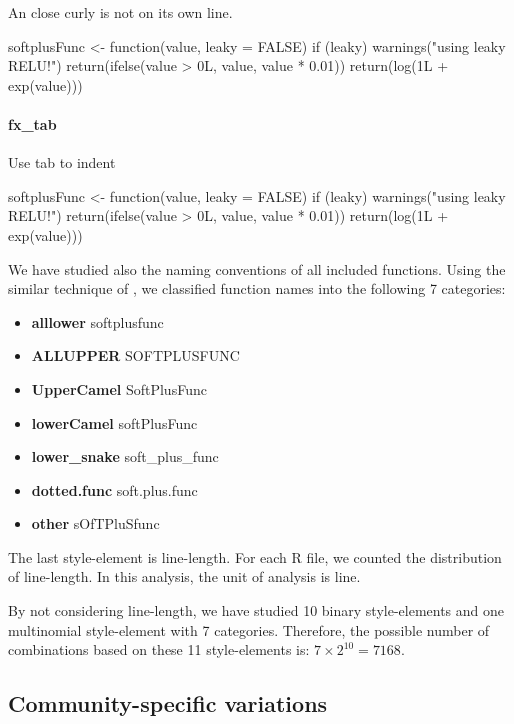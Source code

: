 An close curly is not on its own line.

\begin{example}
softplusFunc <- function(value, leaky = FALSE) {
    if (leaky) {
        warnings("using leaky RELU!")
        return(ifelse(value > 0L, value, value * 0.01)) }
    return(log(1L + exp(value))) }
\end{example}

\paragraph{fx\_tab}

Use tab to indent

\begin{example}
softplusFunc <- function(value, leaky = FALSE) {
    if (leaky) {
        warnings("using leaky RELU!")
        return(ifelse(value > 0L, value, value * 0.01))
    }
    return(log(1L + exp(value)))
}
\end{example}

We have studied also the naming conventions of all included functions. Using the similar technique of \citet{baaaath}, we classified function names into the following 7 categories:

\begin{itemize}
  \item \textbf{alllower} softplusfunc
  \item \textbf{ALLUPPER} SOFTPLUSFUNC
  \item \textbf{UpperCamel} SoftPlusFunc
  \item \textbf{lowerCamel} softPlusFunc
  \item \textbf{lower\_snake} soft\_plus\_func
  \item \textbf{dotted.func} soft.plus.func
  \item \textbf{other} sOfTPluSfunc
\end{itemize}

The last style-element is line-length. For each R file, we counted the distribution of line-length. In this analysis, the unit of analysis is line.

By not considering line-length, we have studied 10 binary style-elements and one multinomial style-element with 7 categories. Therefore, the possible number of combinations based on these 11 style-elements is: $7 \times 2^{10} = 7168$.

\subsection{Community-specific variations}


